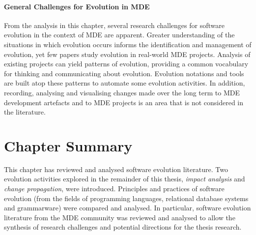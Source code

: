 \paragraph{General Challenges for Evolution in MDE} From the analysis in this chapter, several research challenges for software evolution in the context of MDE are apparent. Greater understanding of the situations in which evolution occurs informs the identification and management of evolution, yet few papers study evolution in real-world MDE projects. Analysis of existing projects can yield patterns of evolution, providing a common vocabulary for thinking and communicating about evolution. Evolution notations and tools are built atop these patterns to automate some evolution activities. In addition, recording, analysing and visualising changes made over the long term to MDE development artefacts and to MDE projects is an area that is not considered in the literature.

\section{Chapter Summary}
\label{sec:literature_review_summary}
This chapter has reviewed and analysed software evolution literature. Two evolution activities explored in the remainder of this thesis, \emph{impact analysis} and \emph{change propagation}, were introduced. Principles and practices of software evolution (from the fields of programming languages, relational database systems and grammarware) were compared and analysed. In particular, software evolution literature from the MDE community was reviewed and analysed to allow the synthesis of research challenges and potential directions for the thesis research.

